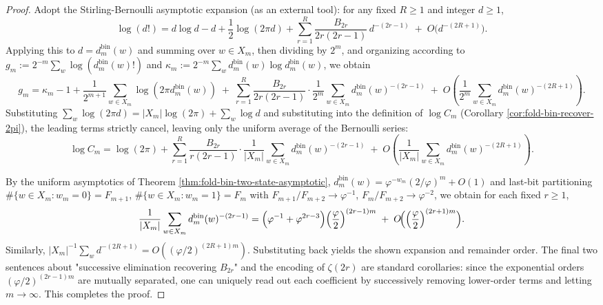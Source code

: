 \begin{proof}
Adopt the Stirling-Bernoulli asymptotic expansion (as an external tool): for any fixed \(R\ge 1\) and integer \(d\ge 1\),
\[
\log(d!)=d\log d-d+\frac12\log(2\pi d)+
\sum_{r=1}^{R}\frac{B_{2r}}{2r(2r-1)}\,d^{-(2r-1)}
\;+\;
O\!\bigl(d^{-(2R+1)}\bigr).
\]
Applying this to \(d=d^{\mathrm{bin}}_m(w)\) and summing over \(w\in X_m\), then dividing by \(2^m\), and organizing according to
\(
g_m:=2^{-m}\sum_w\log(d^{\mathrm{bin}}_m(w)!)
\)
and
\(
\kappa_m:=2^{-m}\sum_w d^{\mathrm{bin}}_m(w)\log d^{\mathrm{bin}}_m(w)
\), we obtain
\[
g_m
=\kappa_m-1+\frac{1}{2^{m+1}}\sum_{w\in X_m}\log(2\pi d^{\mathrm{bin}}_m(w))
\;+\;
\sum_{r=1}^{R}\frac{B_{2r}}{2r(2r-1)}\cdot
\frac{1}{2^{m}}\sum_{w\in X_m} d^{\mathrm{bin}}_m(w)^{-(2r-1)}
\;+\;
O\!\left(\frac{1}{2^{m}}\sum_{w\in X_m} d^{\mathrm{bin}}_m(w)^{-(2R+1)}\right).
\]
Substituting
\(
\sum_w\log(2\pi d)=|X_m|\log(2\pi)+\sum_w\log d
\)
and substituting into the definition of \(\log C_m\) (Corollary \ref{cor:fold-bin-recover-2pi}), the leading terms strictly cancel, leaving only the uniform average of the Bernoulli series:
\[
\log C_m
=\log(2\pi)+
\sum_{r=1}^{R}\frac{B_{2r}}{r(2r-1)}\cdot
\frac{1}{|X_m|}\sum_{w\in X_m} d^{\mathrm{bin}}_m(w)^{-(2r-1)}
\;+\;
O\!\left(\frac{1}{|X_m|}\sum_{w\in X_m} d^{\mathrm{bin}}_m(w)^{-(2R+1)}\right).
\]
\par
By the uniform asymptotics of Theorem \ref{thm:fold-bin-two-state-asymptotic},
\(
d^{\mathrm{bin}}_m(w)=\varphi^{-w_m}(2/\varphi)^m+O(1)
\)
and last-bit partitioning \(\#\{w\in X_m:w_m=0\}=F_{m+1}\), \(\#\{w\in X_m:w_m=1\}=F_m\) with \(F_{m+1}/F_{m+2}\to\varphi^{-1}\), \(F_m/F_{m+2}\to\varphi^{-2}\), we obtain for each fixed \(r\ge 1\),
\[
\frac{1}{|X_m|}\sum_{w\in X_m} d^{\mathrm{bin}}_m(w)^{-(2r-1)}
=\Bigl(\varphi^{-1}+\varphi^{2r-3}\Bigr)\Bigl(\frac{\varphi}{2}\Bigr)^{(2r-1)m}
\;+\;
O\!\Bigl(\Bigl(\frac{\varphi}{2}\Bigr)^{(2r+1)m}\Bigr).
\]
Similarly,
\(
|X_m|^{-1}\sum_w d^{-(2R+1)}
=O((\varphi/2)^{(2R+1)m})
\).
Substituting back yields the shown expansion and remainder order. The final two sentences about "successive elimination recovering \(B_{2r}\)" and the encoding of \(\zeta(2r)\) are standard corollaries: since the exponential orders \((\varphi/2)^{(2r-1)m}\) are mutually separated, one can uniquely read out each coefficient by successively removing lower-order terms and letting \(m\to\infty\). This completes the proof.
\end{proof}
\endinput


